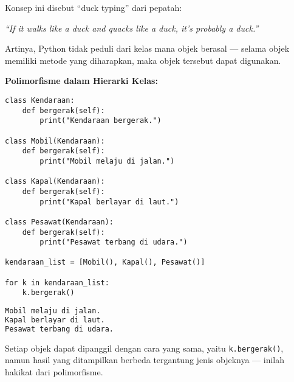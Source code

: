 Konsep ini disebut “duck typing” dari pepatah:
\begin{center}
\textit{“If it walks like a duck and quacks like a duck, it’s probably a duck.”}
\end{center}

Artinya, Python tidak peduli dari kelas mana objek berasal —  
selama objek memiliki metode yang diharapkan, maka objek tersebut dapat digunakan.

\textbf{Polimorfisme dalam Hierarki Kelas:}

\begin{lstlisting}[style=PythonStyle, caption={Hierarki Pewarisan dengan Polimorfisme}]
class Kendaraan:
    def bergerak(self):
        print("Kendaraan bergerak.")

class Mobil(Kendaraan):
    def bergerak(self):
        print("Mobil melaju di jalan.")

class Kapal(Kendaraan):
    def bergerak(self):
        print("Kapal berlayar di laut.")

class Pesawat(Kendaraan):
    def bergerak(self):
        print("Pesawat terbang di udara.")

kendaraan_list = [Mobil(), Kapal(), Pesawat()]

for k in kendaraan_list:
    k.bergerak()
\end{lstlisting}

\begin{lstlisting}[language=bash, caption={Output Program}]
Mobil melaju di jalan.
Kapal berlayar di laut.
Pesawat terbang di udara.
\end{lstlisting}

Setiap objek dapat dipanggil dengan cara yang sama, yaitu \texttt{k.bergerak()},  
namun hasil yang ditampilkan berbeda tergantung jenis objeknya — inilah hakikat dari polimorfisme.

\begin{center}
\end{center}

